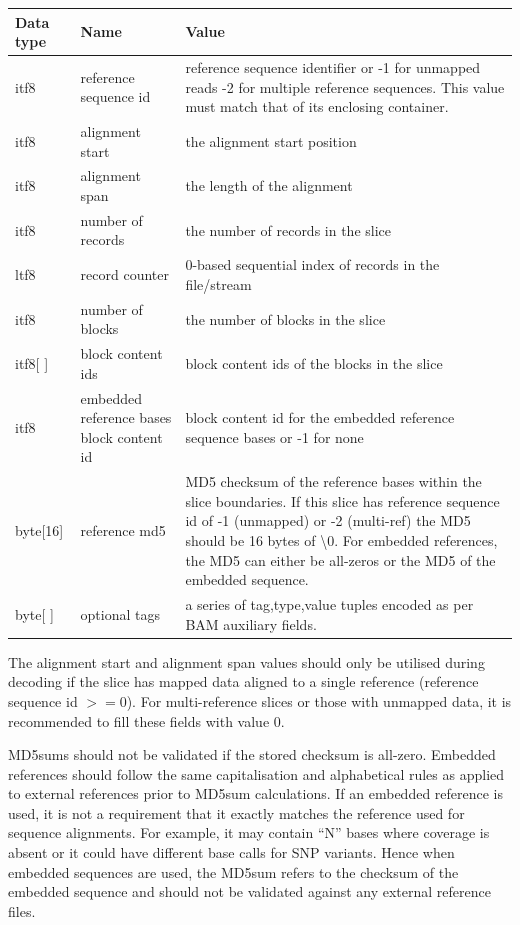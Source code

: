 \documentclass[a4paper]{article}
\begin{document}
\begin{tabular}{|l|l|>{\raggedright}p{200pt}|}
\hline
\textbf{Data type} & \textbf{Name} & \textbf{Value}\tabularnewline
\hline
itf8 & reference sequence id & reference sequence identifier or\linebreak{}
-1 for unmapped reads\linebreak{}
-2 for multiple reference sequences.\linebreak{}
This value must match that of its enclosing container.\tabularnewline
\hline
itf8 & alignment start & the alignment start position\tabularnewline
\hline
itf8 & alignment span & the length of the alignment\tabularnewline
\hline
itf8 & number of records & the number of records in the slice\tabularnewline
\hline
ltf8 & record counter & 0-based sequential index of records in the file/stream\tabularnewline
\hline
itf8 & number of blocks & the number of blocks in the slice\tabularnewline
\hline
itf8[ ] & block content ids & block content ids of the blocks in the slice\tabularnewline
\hline
itf8 & embedded reference bases block content id & block content id for the embedded 
reference sequence bases or -1 for none\tabularnewline
\hline
byte[16] & reference md5 & MD5 checksum of the reference bases within the slice 
boundaries.  If this slice has reference sequence id of -1 (unmapped) or -2 (multi-ref)
the MD5 should be 16 bytes of \textbackslash{}0. For embedded references, the MD5
can either be all-zeros or the MD5 of the embedded sequence.\tabularnewline
\hline
byte[ ] & optional tags & a series of tag,type,value tuples encoded as
per BAM auxiliary fields.\tabularnewline
\hline
\end{tabular}

The alignment start and alignment span values should only be utilised
during decoding if the slice has mapped data aligned to a single
reference (reference sequence id $>= 0$).  For multi-reference slices
or those with unmapped data, it is recommended to fill these fields
with value 0.

MD5sums should not be validated if the stored checksum is all-zero.
Embedded references should follow the same capitalisation and
alphabetical rules as applied to external references prior to MD5sum
calculations. If an embedded reference is used, it is not a
requirement that it exactly matches the reference used for sequence
alignments.  For example, it may contain ``N'' bases where coverage is
absent or it could have different base calls for SNP variants.  Hence
when embedded sequences are used, the MD5sum refers to the checksum of
the embedded sequence and should not be validated against any external
reference files.
\end{document}
